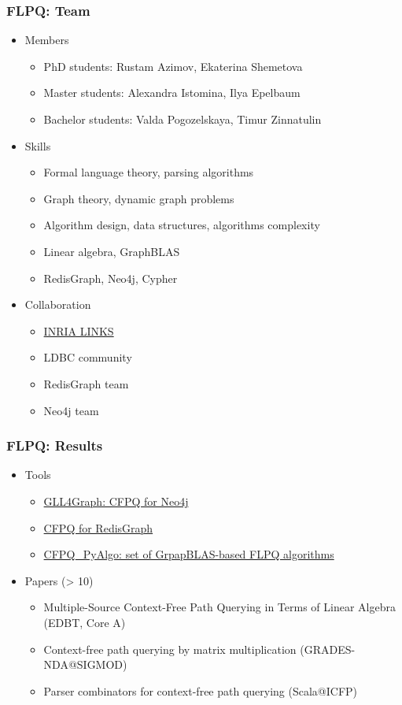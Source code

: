 \documentclass[xcolor=table,aspectratio=169]{beamer}
\begin{document}
\begin{frame}[fragile]
  \frametitle{FLPQ: Team}
  \begin{itemize}
    \item Members 
    \begin{itemize}
      \item PhD students: Rustam Azimov, Ekaterina Shemetova
      \item Master students: Alexandra Istomina, Ilya Epelbaum
      \item Bachelor students: Valda Pogozelskaya, Timur Zinnatulin
    \end{itemize} 
    \item Skills 
    \begin{itemize}
      \item Formal language theory, parsing algorithms
      \item Graph theory, dynamic graph problems
      \item Algorithm design, data structures, algorithms complexity 
      \item Linear algebra, GraphBLAS
      \item RedisGraph, Neo4j, Cypher
    \end{itemize}
    \item Collaboration
    \begin{itemize}
      \item \href{https://team.inria.fr/links/}{INRIA LINKS}
      \item LDBC community
      \item RedisGraph team
      \item Neo4j team
    \end{itemize}
  \end{itemize}
\end{frame}

\begin{frame}[fragile]
  \frametitle{FLPQ: Results}
    \begin{itemize}
      \item Tools
      \begin{itemize}
        \item \href{https://github.com/JetBrains-Research/GLL4Graph}{GLL4Graph: CFPQ for Neo4j}
        \item \href{https://github.com/YaccConstructor/RedisGraph}{CFPQ for RedisGraph}
        \item \href{https://github.com/JetBrains-Research/CFPQ_PyAlgo}{CFPQ\_PyAlgo: set of GrpapBLAS-based FLPQ algorithms}
      \end{itemize}
      \item Papers (> 10)
      \begin{itemize}
        \item Multiple-Source Context-Free Path Querying in Terms of Linear Algebra (EDBT, Core A)
        \item Context-free path querying by matrix multiplication (GRADES-NDA@SIGMOD)
        \item Parser combinators for context-free path querying (Scala@ICFP)
      \end{itemize} 
    \end{itemize}
\end{frame}
\end{document}
